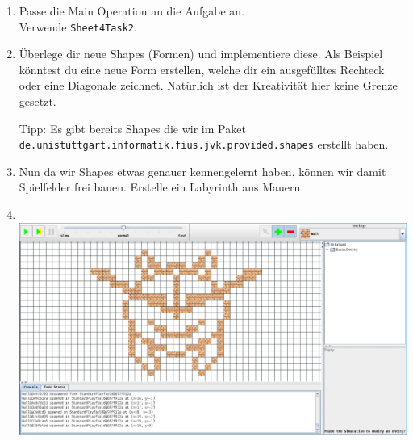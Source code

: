 
\begin{enumerate}
	\item
		Passe die Main Operation an die Aufgabe an.\\
		Verwende \lstinline{Sheet4Task2}.

	\item
		Überlege dir neue Shapes (Formen) und implementiere diese.
		Als Beispiel könntest du eine neue Form erstellen, welche dir ein ausgefülltes Rechteck oder eine Diagonale zeichnet.
		Natürlich ist der Kreativität hier keine Grenze gesetzt.

		Tipp: Es gibt bereits Shapes die wir im Paket \lstinline{de.unistuttgart.informatik.fius.jvk.provided.shapes} erstellt haben.

	\item
		Nun da wir Shapes etwas genauer kennengelernt haben, können wir damit Spielfelder frei bauen.
		Erstelle ein Labyrinth aus Mauern.

	\item
		\\
		\includegraphics[width=\linewidth]{./figures/playfield.png}

\end{enumerate}

\newpage
